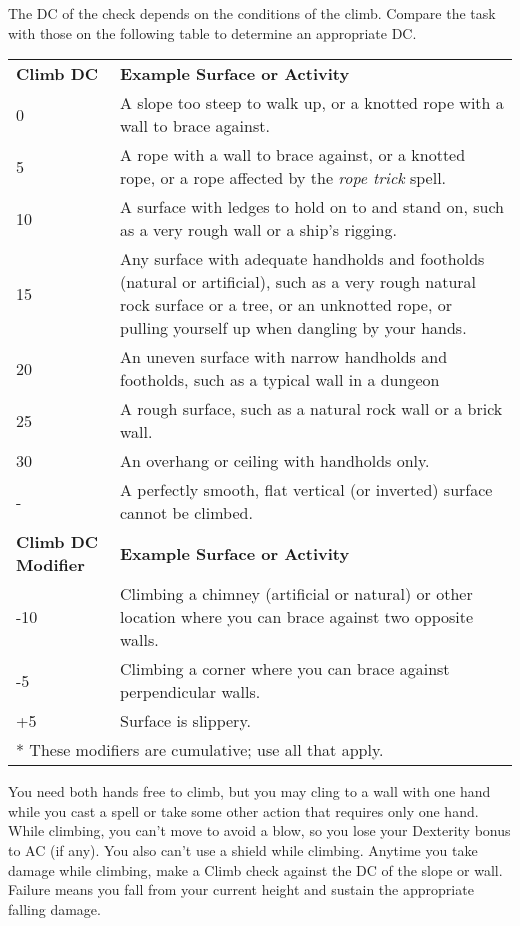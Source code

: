 The DC of the check depends on the conditions of the climb. Compare the task with those on the following table to determine an appropriate DC.
\begin{table}
\sffamily
 \begin{tabular}{ll}
\textbf{Climb DC} & \textbf{Example Surface or Activity} \\
0 & A slope too steep to walk up, or a knotted rope with a wall to brace against.\\
5 & A rope with a wall to brace against, or a knotted rope, or a rope affected by the \textit{rope trick }spell. \\
10 & A surface with ledges to hold on to and stand on, such as a very rough wall or a ship's rigging. \\
15 & Any surface with adequate handholds and footholds (natural or artificial), such as a very rough natural rock surface or a tree, or an unknotted rope, or pulling yourself up when dangling by your hands. \\
20 & An uneven surface with narrow handholds and footholds, such as a typical wall in a dungeon \\
25 & A rough surface, such as a natural rock wall or a brick wall. \\
30 & An overhang or ceiling with handholds only. \\
- & A perfectly smooth, flat vertical (or inverted) surface cannot be climbed.\\
\textbf{Climb DC Modifier} & \textbf{Example Surface or Activity}\\
-10 & Climbing a chimney (artificial or natural) or other location where you can brace against two opposite walls. \\
-5 & Climbing a corner where you can brace against perpendicular walls.\\
+5 & Surface is slippery.\\
\multicolumn{2}{l}{* These modifiers are cumulative; use all that apply.}
 \end{tabular}
\end{table}

You need both hands free to climb, but you may cling to a wall with one hand while you cast a spell or take some other action that requires only one hand. While climbing, you can't move to avoid a blow, so you lose your Dexterity bonus to AC (if any). You also can't use a shield while climbing. Anytime you take damage while climbing, make a Climb check against the DC of the slope or wall. Failure means you fall from your current height and sustain the appropriate falling damage.
				
